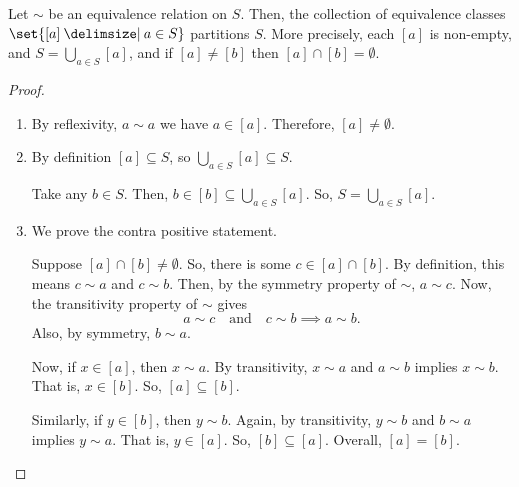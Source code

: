 \documentclass[11pt]{penrose}
\begin{document}
\begin{nthm}
    Let $\sim$ be an equivalence relation on $S$. Then, the collection of equivalence classes $\set{[a] \st a \in S}$ partitions $S$. More precisely, each $[a]$ is non-empty, and $S = \bigcup_{a \in S} [a]$, and if $[a] \neq [b]$ then $[a] \cap [b] = \emptyset$.
\end{nthm}
\begin{proof}
    \phantom{}
    \begin{enumerate}
        \item By reflexivity, $a \sim a$ we have $a \in [a]$. Therefore, $[a] \neq \emptyset$.

        \item By definition $[a] \subseteq S$, so $\bigcup_{a \in S} [a] \subseteq S$.

        Take any $b \in S$. Then, $b \in [b] \subseteq \bigcup_{a \in S} [a]$. So, $S = \bigcup_{a \in S} [a]$.

        \item We prove the contra positive statement.

        Suppose $[a] \cap [b] \neq \emptyset$. So, there is some $c \in [a] \cap [b]$. By definition, this means $c \sim a$ and $c \sim b$. Then, by the symmetry property of $\sim$, $a \sim c$. Now, the transitivity property of $\sim$ gives
        \begin{equation}
            a \sim c \quad\text{and}\quad c \sim b \implies a \sim b.
        \end{equation}
        Also, by symmetry, $b \sim a$.

        Now, if $x \in [a]$, then $x \sim a$. By transitivity, $x \sim a$ and $a \sim b$ implies $x \sim b$. That is, $x \in [b]$. So, $[a] \subseteq [b]$.

        Similarly, if $y \in [b]$, then $y \sim b$. Again, by transitivity, $y \sim b$ and $b \sim a$ implies $y \sim a$. That is, $y \in [a]$. So, $[b] \subseteq [a]$. Overall, $[a] = [b]$.
    \end{enumerate}
\end{proof}
\end{document}
